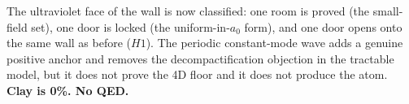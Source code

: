 \begin{qbox}
The ultraviolet face of the wall is now classified: one room is proved (the small-field set), one
door is locked (the uniform-in-$a_0$ form), and one door opens onto the same wall as before ($H1$).
The periodic constant-mode wave adds a genuine positive anchor and removes the decompactification
objection in the tractable model, but it does not prove the 4D floor and it does not produce the atom.
\textbf{Clay is 0\%. No QED.}
\end{qbox}
